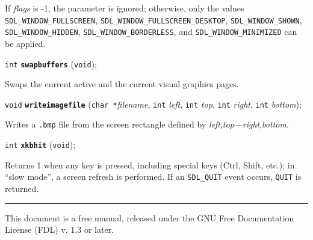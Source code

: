 \documentclass[a4paper,11pt]{article}
\newcommand{\V}{\texttt{void}}      %
\newcommand{\I}{\texttt{int}}       %
\newcommand{\C}{\texttt{char *}}    %
\newcommand{\func}[1]{\textbf{\texttt{#1}}}  %
\newcommand{\A}[1]{\emph{#1}}       %
\newcommand{\F}[1]{\texttt{#1}}     %
\newcommand{\T}[1]{\texttt{#1}}     %
\newenvironment{bgi}
{ %
  \begin{snugshade}
}
{ %
  \end{snugshade}
}
\begin{document}
If \A{flags} is -1, the parameter is ignored; otherwise, only the
values \T{SDL\_WINDOW\_FULLSCREEN},
\T{SDL\_WINDOW\_FULLSCREEN\_DESKTOP}, \T{SDL\_WINDOW\_SHOWN},
\T{SDL\_WINDOW\_HIDDEN}, \T{SDL\_WINDOW\-\_BORDERLESS}, and
\T{SDL\_WINDOW\_MINIMIZED} can be applied.


\begin{bgi}
\I{} \func{swapbuffers} (\V{});
\end{bgi}

Swaps the current active and the current visual graphics pages.


\begin{bgi}
\V{} \func{writeimagefile} (\C{}\A{filename}, \I{} \A{left}, \I{}
\A{top}, \I{} \A{right}, \I{} \A{bottom});
\end{bgi}

Writes a \F{.bmp} file from the screen rectangle defined by
\A{left},\A{top}---\A{right},\A{bottom}.


\begin{bgi}
\I{} \func{xkbhit} (\V{});
\end{bgi}

Returns 1 when any key is pressed, including special keys (Ctrl, Shift,
etc.); in ``slow mode'', a screen refresh is performed. If an
\T{SDL\_QUIT} event occurs, \T{QUIT} is returned.


\bigskip

\rule{\linewidth}{0.2pt}

This document is a free manual, released under the GNU Free
Documentation License (FDL) v. 1.3 or later.
\end{document}
